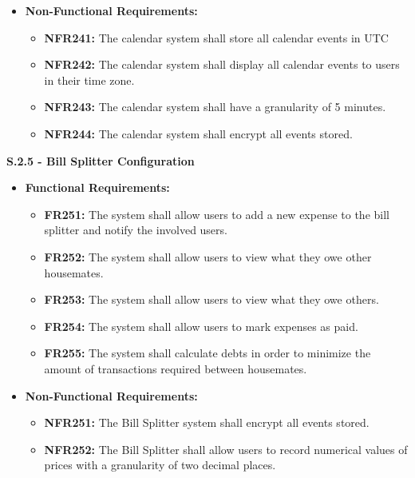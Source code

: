 \documentclass{scrreprt}
\theoremstyle{definition}
\begin{document}
\begin{flushleft}
\begin{itemize}
\begin{itemize}
  		\end{itemize}
  		\item \textbf{Non-Functional Requirements:}
  		\begin{itemize}
  			\item \textbf{NFR241:} The calendar system shall store all calendar events in UTC
  			\item \textbf{NFR242:} The calendar system shall display all calendar events to users in their time zone. 
  			\item \textbf{NFR243:} The calendar system shall have a granularity of 5 minutes.
  			\item \textbf{NFR244:} The calendar system shall encrypt all events stored.
  		\end{itemize}
  	\end{itemize}
  	\item \textbf{S.2.5 - Bill Splitter Configuration}
  	\begin{itemize}
  		\item \textbf{Functional Requirements:}
  		\begin{itemize}
  			\item \textbf{FR251:} The system shall allow users to add a new expense to the bill splitter and notify the involved users.
            \item \textbf{FR252:} The system shall allow users to view what they owe other housemates.
            \item \textbf{FR253:} The system shall allow users to view what they owe others.
            \item \textbf{FR254:} The system shall allow users to mark expenses as paid.
            \item \textbf{FR255:} The system shall calculate debts in order to minimize the amount of transactions required between housemates.
  		\end{itemize}
  		\item \textbf{Non-Functional Requirements:}
  		\begin{itemize}
  			\item \textbf{NFR251:} The Bill Splitter system shall encrypt all events stored.
  			\item \textbf{NFR252:} The Bill Splitter shall allow users to record numerical values of prices with a granularity of two decimal places.

  		\end{itemize}
  	\end{itemize}
\end{flushleft}
\end{document}
